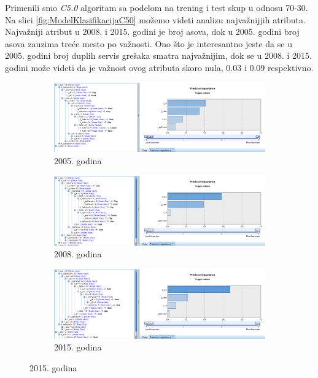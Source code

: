 \documentclass[a4paper]{article}
\begin{document}
Primenili smo \textit{C5.0} algoritam sa podelom na trening i test skup u odnosu 70-30. Na slici \ref{fig:ModelKlasifikacijaC50} možemo videti analizu najvažnijjih atributa. Najvažniji atribut u 2008. i 2015. godini je broj asova, dok u 2005. godini broj asova zauzima treće mesto po važnosti. Ono što je interesantno jeste da se u 2005. godini broj duplih servis grešaka smatra najvažnijim, dok se u 2008. i 2015. godini može videti da je važnost ovog atributa skoro nula, 0.03 i 0.09 respektivno.

\begin{figure}[H]
	\begin{subfigure}[h]{\textwidth}
		\begin{center}
			\includegraphics[scale=0.50]{Klasifikacija/C50/Model_Surface2005.png}
		\end{center}
		\caption{2005. godina}
		\label{fig:ModelKlasifikacijaC502005}
	\end{subfigure}
	
	\vspace{0.5cm}
	\begin{subfigure}[h]{\textwidth}
		\begin{center}
			\includegraphics[scale=0.50]{Klasifikacija/C50/Model_Surface2008.png}
		\end{center}
		\caption{2008. godina}
		\label{fig:ModelKlasifikacijaC502008}
	\end{subfigure}
	
	\vspace{0.5cm}
	\begin{subfigure}[h]{\textwidth}
		\begin{center}
			\includegraphics[scale=0.50]{Klasifikacija/C50/Model_Surface2015.png}
		\end{center}
		\caption{2015. godina}
		\label{fig:ModelKlasifikacijaC502015}
	\end{subfigure}
	

\end{figure}
\end{document}
